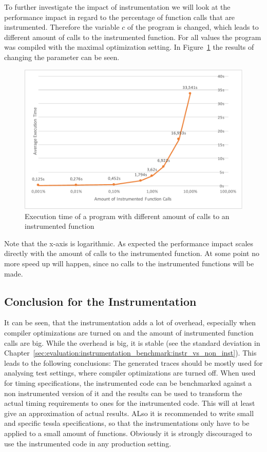 To further investigate the impact of instrumentation we will look at the performance impact in regard to the percentage of function calls that are instrumented.
Therefore the variable \(c\) of the program is changed, which leads to different amount of calls to the instrumented function.
For all values the program was compiled with the maximal optimization setting.
In Figure~\ref{fig:chap_eval:instrument_benchmark_amount_results} the results of changing the parameter can be seen.

\begin{figure}
  \includegraphics[width=\textwidth]{gfx/instrumentation_amount_benchmark.pdf}
  \caption{Execution time of a program with different amount of calls to an instrumented function}
\label{fig:chap_eval:instrument_benchmark_amount_results}
\end{figure}

Note that the x-axis is logarithmic.
As expected the performance impact scales directly with the amount of calls to the instrumented function.
At some point no more speed up will happen, since no calls to the instrumented functions will be made.

\subsection{Conclusion for the Instrumentation}

It can be seen, that the instrumentation adds a lot of overhead, especially when compiler optimizations are turned on and the amount of instrumented function calls are big.
While the overhead is big, it is stable (see the standard deviation in Chapter~\ref{sec:evaluation:instrumentation_benchmark:instr_vs_non_inst}).
This leads to the following conclusions: The generated traces should be mostly used for analysing test settings, where compiler optimizations are turned off.
When used for timing specifications, the instrumented code can be benchmarked against a non instrumented version of it and the results can be used to transform the actual timing requirements to ones for the instrumented code.
This will at least give an approximation of actual results.
ALso it is recommended to write small and specific \gls{tessla} specifications, so that the instrumentations only have to be applied to a small amount of functions.
Obviously it is strongly discouraged to use the instrumented code in any production setting.

